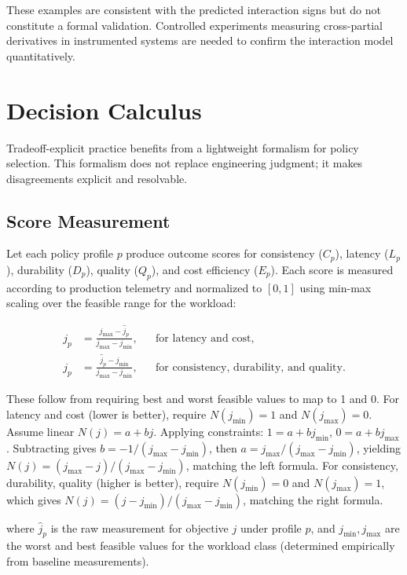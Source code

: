 \documentclass[conference]{IEEEtran}
\begin{document}
These examples are consistent with the predicted interaction signs but do not constitute a formal validation. Controlled experiments measuring cross-partial derivatives in instrumented systems are needed to confirm the interaction model quantitatively.

\section{Decision Calculus}
\label{sec:calculus}

Tradeoff-explicit practice benefits from a lightweight formalism for policy selection. This formalism does not replace engineering judgment; it makes disagreements explicit and resolvable.

\subsection{Score Measurement}

Let each policy profile $p$ produce outcome scores for consistency ($C_p$), latency ($L_p$), durability ($D_p$), quality ($Q_p$), and cost efficiency ($E_p$). Each score is measured according to production telemetry and normalized to $[0, 1]$ using min-max scaling over the feasible range for the workload:

\begin{equation}
\begin{aligned}
j_p &= \frac{j_{\max}-\hat{j}_p}{j_{\max}-j_{\min}},
&& \text{for latency and cost,} \\
j_p &= \frac{\hat{j}_p-j_{\min}}{j_{\max}-j_{\min}},
&& \text{for consistency, durability, and quality.}
\end{aligned}
\end{equation}

These follow from requiring best and worst feasible values to map to 1 and 0. For latency and cost (lower is better), require $N(j_{\min}) = 1$ and $N(j_{\max}) = 0$. Assume linear $N(j) = a + bj$. Applying constraints: $1 = a + b j_{\min}$, $0 = a + b j_{\max}$. Subtracting gives $b = -1/(j_{\max} - j_{\min})$, then $a = j_{\max}/(j_{\max} - j_{\min})$, yielding $N(j) = (j_{\max} - j)/(j_{\max} - j_{\min})$, matching the left formula. For consistency, durability, quality (higher is better), require $N(j_{\min}) = 0$ and $N(j_{\max}) = 1$, which gives $N(j) = (j - j_{\min})/(j_{\max} - j_{\min})$, matching the right formula.

where $\hat{j}_p$ is the raw measurement for objective $j$ under profile $p$, and $j_{\text{min}}, j_{\text{max}}$ are the worst and best feasible values for the workload class (determined empirically from baseline measurements).
\end{document}
